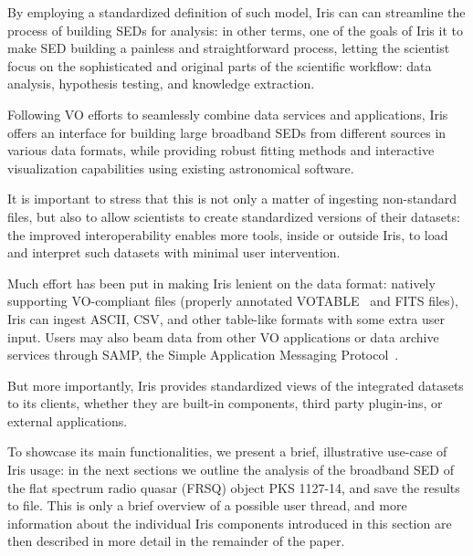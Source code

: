 \documentclass[5p]{elsarticle}
\begin{document}
By employing a standardized definition of such model, Iris can can streamline the process of building SEDs for analysis: in other terms, one of the goals of Iris it to make SED building a painless and straightforward process, letting the scientist focus on the sophisticated and original parts of the scientific workflow: data analysis, hypothesis testing, and knowledge extraction.

Following VO efforts to seamlessly combine data services and applications, Iris offers an interface for building large broadband SEDs from different sources in various data formats, while providing robust fitting methods and interactive visualization capabilities using existing astronomical software.

It is important to stress that this is not only a matter of ingesting non-standard files, but also to allow scientists to create standardized versions of their datasets: the improved interoperability enables more tools, inside or outside Iris, to load and interpret such datasets with minimal user intervention.

Much effort has been put in making Iris lenient on the data format: natively supporting VO-compliant files (properly annotated VOTABLE~\citep{2011arXiv1110.0524O} and FITS files), Iris can ingest ASCII, CSV, and other table-like formats with some extra user input. Users may also beam data from other VO applications or data archive services through SAMP, the Simple Application Messaging Protocol~\citep{2011arXiv1110.0528T}.

But more importantly, Iris provides standardized views of the integrated datasets to its clients, whether they are built-in components, third party plugin-ins, or external applications.


To showcase its main functionalities, we present a brief, illustrative use-case of Iris usage: in the next sections we outline the analysis of the broadband SED of the flat spectrum radio quasar (FRSQ) object PKS 1127-14, and save the results to file. This is only a brief overview of a possible user thread, and more information about the individual Iris components introduced in this section are then described in more detail in the remainder of the paper.
\end{document}
